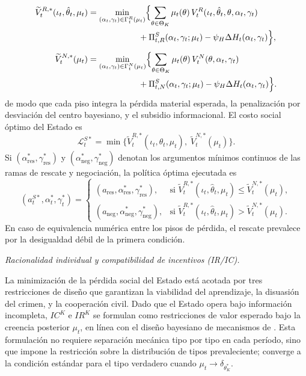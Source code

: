 \documentclass[review,authoryear,12pt]{elsarticle}
\theoremstyle{plain}
\theoremstyle{definition}
\newcommand{\ThetaK}{\Theta_K}
\newcommand{\1}{\mathbf{1}}
\begin{document}
\begin{align}
\widetilde{V}_t^{R,\ast}(\iota_t,\hat{\theta}_t,\mu_t)&=\min_{(\alpha_t,\gamma_t)\in\Gamma_t^R(\mu_t)}\Bigl\{\sum_{\theta\in\ThetaK}\mu_t(\theta)\,V_t^R(\iota_t,\hat{\theta}_t,\theta,\alpha_t,\gamma_t)\nonumber\\
&\qquad\qquad\qquad+\Pi_{t,R}^S(\alpha_t,\gamma_t;\mu_t)-\psi_H\Delta H_t(\alpha_t,\gamma_t)\Bigr\},\label{eq:piso-R}\\[4pt]
\widetilde{V}_t^{N,\ast}(\mu_t)&=\min_{(\alpha_t,\gamma_t)\in\Gamma_t^N(\mu_t)}\Bigl\{\sum_{\theta\in\ThetaK}\mu_t(\theta)\,V_t^N(\theta,\alpha_t,\gamma_t)\nonumber\\
&\qquad\qquad\qquad+\Pi_{t,N}^S(\alpha_t,\gamma_t;\mu_t)-\psi_H\Delta H_t(\alpha_t,\gamma_t)\Bigr\}.\label{eq:piso-N}
\end{align}
de modo que cada piso integra la pérdida material esperada, la penalización por desviación del centro bayesiano, y el subsidio informacional. El costo social óptimo del Estado es
\begin{equation}
\mathcal{L}_t^{S\ast}=\min\bigl\{\widetilde{V}_t^{R,\ast}(\iota_t,\hat{\theta}_t,\mu_t),\;\widetilde{V}_t^{N,\ast}(\mu_t)\bigr\}.
\label{eq:state-expected-loss}
\end{equation}
Si $(\alpha_{\mathrm{res}}^\ast,\gamma_{\mathrm{res}}^\ast)$ y $(\alpha_{\mathrm{neg}}^\ast,\gamma_{\mathrm{neg}}^\ast)$ denotan los argumentos mínimos continuos de las ramas de rescate y negociación, la política óptima ejecutada es
\begin{equation}
(a_t^{S\ast},\alpha_t^\ast,\gamma_t^\ast)=\begin{cases}(a_{\mathrm{res}},\alpha_{\mathrm{res}}^\ast,\gamma_{\mathrm{res}}^\ast), & \text{si }\widetilde{V}_t^{R,\ast}(\iota_t,\hat{\theta}_t,\mu_t)\le\widetilde{V}_t^{N,\ast}(\mu_t),\\[4pt](a_{\mathrm{neg}},\alpha_{\mathrm{neg}}^\ast,\gamma_{\mathrm{neg}}^\ast), & \text{si }\widetilde{V}_t^{R,\ast}(\iota_t,\hat{\theta}_t,\mu_t)>\widetilde{V}_t^{N,\ast}(\mu_t).\end{cases}
\label{eq:state-discrete-rule}
\end{equation}
En caso de equivalencia numérica entre los pisos de pérdida, el rescate prevalece por la desigualdad débil de la primera condición.

\medskip
\noindent\textit{Racionalidad individual y compatibilidad de incentivos (IR/IC).}

\noindent La minimización de la pérdida social del Estado está acotada por tres restricciones de diseño que garantizan la viabilidad del aprendizaje, la disuasión del crimen, y la cooperación civil. Dado que el Estado opera bajo información incompleta, $IC^K$ e $IR^K$ se formulan como restricciones de valor esperado bajo la creencia posterior $\mu_t$, en línea con el diseño bayesiano de mecanismos de \citet{HolmstromMyerson1983}. Esta formulación no requiere separación mecánica tipo por tipo en cada período, sino que impone la restricción sobre la distribución de tipos prevaleciente; converge a la condición estándar para el tipo verdadero cuando $\mu_t\to\delta_{\theta_K^\ast}$.
\end{document}
